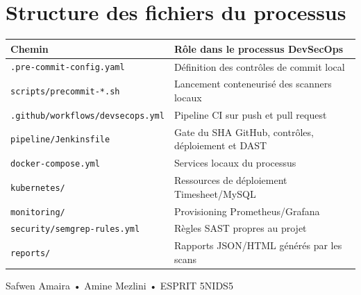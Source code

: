 \documentclass[11pt,a4paper,oneside]{report}
\newcommand{\pathfile}[1]{\nolinkurl{#1}}
\begin{document}
\section*{Structure des fichiers du processus}
\begin{longtable}{@{}p{5.3cm}p{8.7cm}@{}}
\toprule
Chemin & Rôle dans le processus DevSecOps \\
\midrule
\pathfile{.pre-commit-config.yaml} & Définition des contrôles de commit local \\
\pathfile{scripts/precommit-*.sh} & Lancement conteneurisé des scanners locaux \\
\pathfile{.github/workflows/devsecops.yml} & Pipeline CI sur push et pull request \\
\pathfile{pipeline/Jenkinsfile} & Gate du SHA GitHub, contrôles, déploiement et DAST \\
\pathfile{docker-compose.yml} & Services locaux du processus \\
\pathfile{kubernetes/} & Ressources de déploiement Timesheet/MySQL \\
\pathfile{monitoring/} & Provisioning Prometheus/Grafana \\
\pathfile{security/semgrep-rules.yml} & Règles SAST propres au projet \\
\pathfile{reports/} & Rapports JSON/HTML générés par les scans \\
\bottomrule
\end{longtable}

\vfill
\begin{center}
\color{graytext}\small Safwen Amaira • Amine Mezlini • ESPRIT 5NIDS5
\end{center}
\end{document}
